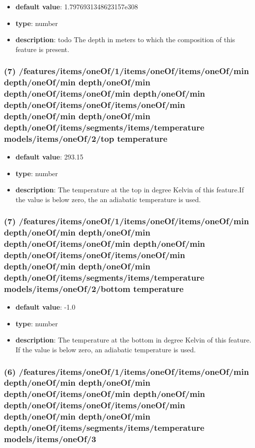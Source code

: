 \begin{itemize}[leftmargin=7em]\item {\bf default value}: 1.7976931348623157e308
\item {\bf type}: number
\item {\bf description}: todo The depth in meters to which the composition of this feature is present.
\end{itemize}\subsubsection{(7) /features/items/oneOf/1/items/oneOf/items/oneOf/min depth/oneOf/min depth/oneOf/min depth/oneOf/items/oneOf/min depth/oneOf/min depth/oneOf/items/oneOf/items/oneOf/min depth/oneOf/min depth/oneOf/min depth/oneOf/items/segments/items/temperature models/items/oneOf/2/top temperature}
\begin{itemize}[leftmargin=7em]\item {\bf default value}: 293.15
\item {\bf type}: number
\item {\bf description}: The temperature at the top in degree Kelvin of this feature.If the value is below zero, the an adiabatic temperature is used.
\end{itemize}\subsubsection{(7) /features/items/oneOf/1/items/oneOf/items/oneOf/min depth/oneOf/min depth/oneOf/min depth/oneOf/items/oneOf/min depth/oneOf/min depth/oneOf/items/oneOf/items/oneOf/min depth/oneOf/min depth/oneOf/min depth/oneOf/items/segments/items/temperature models/items/oneOf/2/bottom temperature}
\begin{itemize}[leftmargin=7em]\item {\bf default value}: -1.0
\item {\bf type}: number
\item {\bf description}: The temperature at the bottom in degree Kelvin of this feature. If the value is below zero, an adiabatic temperature is used.
\end{itemize}\subsubsection{(6) /features/items/oneOf/1/items/oneOf/items/oneOf/min depth/oneOf/min depth/oneOf/min depth/oneOf/items/oneOf/min depth/oneOf/min depth/oneOf/items/oneOf/items/oneOf/min depth/oneOf/min depth/oneOf/min depth/oneOf/items/segments/items/temperature models/items/oneOf/3}
